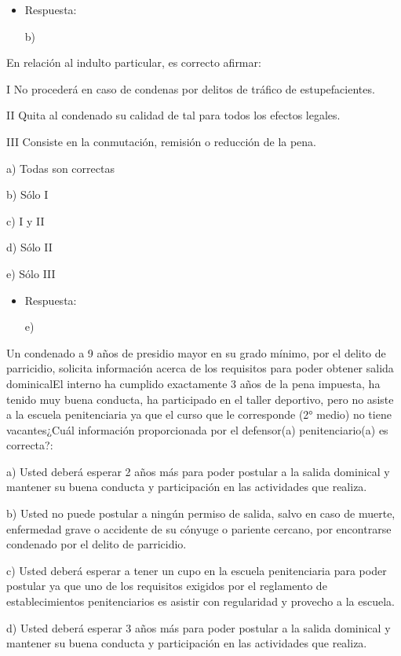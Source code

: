 \documentclass[letterpaper, 11pt]{article}
\begin{document}
\begin{itemize}
\item Respuesta:

b)
\end{itemize}


En relación al indulto particular, es correcto afirmar:

I No procederá en caso de condenas por delitos de tráfico de
estupefacientes.

II Quita al condenado su calidad de tal para todos los efectos
legales.

III Consiste en la conmutación, remisión o reducción de la pena.


a) Todas son correctas

b) Sólo I

c) I y II

d) Sólo II

e) Sólo III

\begin{itemize}
\item Respuesta:

e)
\end{itemize}


Un condenado a 9 años de presidio mayor en su grado mínimo, por el
delito de parricidio, solicita información acerca de los requisitos
para poder obtener salida dominicalEl interno ha cumplido exactamente
3 años de la pena impuesta, ha tenido muy buena conducta, ha
participado en el taller deportivo, pero no asiste a la escuela
penitenciaria ya que el curso que le corresponde (2° medio) no tiene
vacantes¿Cuál información proporcionada por el defensor(a)
penitenciario(a) es correcta?:


a) Usted deberá esperar 2 años más para poder postular a la salida
dominical y mantener su buena conducta y participación en las
actividades que realiza.

b) Usted no puede postular a ningún permiso de salida, salvo en caso
de muerte, enfermedad grave o accidente de su cónyuge o pariente
cercano, por encontrarse condenado por el delito de parricidio.

c) Usted deberá esperar a tener un cupo en la escuela penitenciaria
para poder postular ya que uno de los requisitos exigidos por el
reglamento de establecimientos penitenciarios es asistir con
regularidad y provecho a la escuela.

d) Usted deberá esperar 3 años más para poder postular a la salida
dominical y mantener su buena conducta y participación en las
actividades que realiza.
\end{document}
